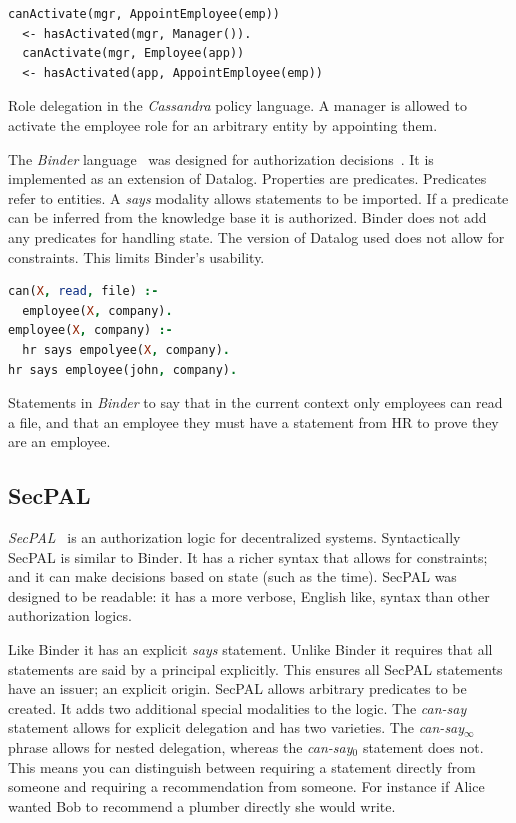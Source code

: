 \documentclass[a4paper,sfsidenotes]{%
  scrartcl%
}
\begin{document}
\begin{marginfigure}
  \begin{lstlisting}[language=Cassandra]
  canActivate(mgr, AppointEmployee(emp))
  <- hasActivated(mgr, Manager()).
  canActivate(mgr, Employee(app))
  <- hasActivated(app, AppointEmployee(emp))
  \end{lstlisting}
  \caption[Role delegation in the \emph{Cassandra} policy language.]{Role delegation in the \emph{Cassandra} policy language. A manager is
  allowed to activate the employee role for an arbitrary entity by appointing
  them.}
\label{code:cassandra}
\end{marginfigure}

The \emph{Binder} language~\cite{DeTreville:2002ff} was designed for
authorization decisions~\cite{Abadi:2003kt}.  It is implemented as an extension
of Datalog.  Properties are predicates. Predicates refer to entities.  A
\emph{says} modality allows statements to be imported.  If a predicate can be
inferred from the knowledge base it is authorized.  Binder does not add any
predicates for handling state.  The version of Datalog used does not allow for
constraints.  This limits Binder's usability.

\begin{marginfigure}
  \begin{lstlisting}[language=Prolog,morekeywords={*,says,:-}]
can(X, read, file) :- 
  employee(X, company).
employee(X, company) :- 
  hr says empolyee(X, company).
hr says employee(john, company).
  \end{lstlisting}
  \caption[Binder example.]{Statements in \emph{Binder} to say that in the current context only
    employees can read a file, and that an employee they must have a statement
    from HR to prove they are an employee.}
\label{code:binder}
\end{marginfigure}


\subsection{SecPAL}

\emph{{SecPAL}}~\cite{Becker:2006vh} is an authorization logic for decentralized
systems. Syntactically {SecPAL} is similar to Binder. It has a richer syntax
that allows for constraints; and it can make decisions based on state (such as the
time). {SecPAL} was designed to be readable: it has a more verbose, English like,
syntax than other authorization logics.

Like Binder it has an explicit \emph{says} statement. Unlike Binder it requires
that all statements are said by a principal explicitly. This ensures all SecPAL
statements have an issuer; an explicit origin. {SecPAL} allows arbitrary
predicates to be created. It adds two additional special modalities to the
logic. The \emph{can-say} statement allows for explicit delegation and has two
varieties.  The \emph{can-say$_\infty$} phrase allows for nested delegation,
whereas the \emph{can-say$_0$} statement does not.  This means you can
distinguish between requiring a statement directly from someone and requiring a
recommendation from someone.  For instance if Alice wanted Bob to recommend a
plumber directly she would write.
\end{document}
